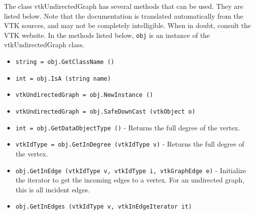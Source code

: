 The class vtkUndirectedGraph has several methods that can be used.
  They are listed below.
Note that the documentation is translated automatically from the VTK sources,
and may not be completely intelligible.  When in doubt, consult the VTK website.
In the methods listed below, \verb|obj| is an instance of the vtkUndirectedGraph class.
\begin{itemize}
\item  \verb|string = obj.GetClassName ()|

\item  \verb|int = obj.IsA (string name)|

\item  \verb|vtkUndirectedGraph = obj.NewInstance ()|

\item  \verb|vtkUndirectedGraph = obj.SafeDownCast (vtkObject o)|

\item  \verb|int = obj.GetDataObjectType ()| -  Returns the full degree of the vertex.

\item  \verb|vtkIdType = obj.GetInDegree (vtkIdType v)| -  Returns the full degree of the vertex.

\item  \verb|obj.GetInEdge (vtkIdType v, vtkIdType i, vtkGraphEdge e)| -  Initialize the iterator to get the incoming edges to a vertex.
 For an undirected graph, this is all incident edges.

\item  \verb|obj.GetInEdges (vtkIdType v, vtkInEdgeIterator it)|

\end{itemize}
